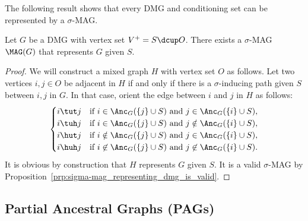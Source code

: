 The following result shows that every DMG and conditioning set can be represented by a $\sigma$-MAG.
\begin{Prp}\label{prp:from_dmg_to_sigma-mag}
  Let $G$ be a DMG with vertex set $V^+ = S \dcup O$.
  There exists a $\sigma$-MAG $\MAG(G)$ that represents $G$ given $S$.
\end{Prp}
\begin{proof}
  We will construct a mixed graph $H$ with vertex set $O$ as follows.
  Let two vertices $i,j \in O$ be adjacent in $H$ if and only if there is a $\sigma$-inducing path given $S$ between $i,j$ in $G$.
  In that case, orient the edge between $i$ and $j$ in $H$ as follows:
    $$\begin{cases}
      \text{$i \tut j$} & \text{if $i \in \Anc_G(\{j\} \cup S)$ and $j \in \Anc_G(\{i\} \cup S)$}, \\
      \text{$i \tuh j$} & \text{if $i \in \Anc_G(\{j\} \cup S)$ and $j \notin \Anc_G(\{i\} \cup S)$}, \\
      \text{$i \hut j$} & \text{if $i \notin \Anc_G(\{j\} \cup S)$ and $j \in \Anc_G(\{i\} \cup S)$}, \\
      \text{$i \huh j$} & \text{if $i \not\in \Anc_G(\{j\} \cup S)$ and $j \not\in \Anc_G(\{i\} \cup S)$.}
    \end{cases}$$
  It is obvious by construction that $H$ represents $G$ given $S$.
  It is a valid $\sigma$-MAG by Proposition~\ref{prp:sigma-mag_representing_dmg_is_valid}.
\end{proof}


\subsection{Partial Ancestral Graphs (PAGs)}

